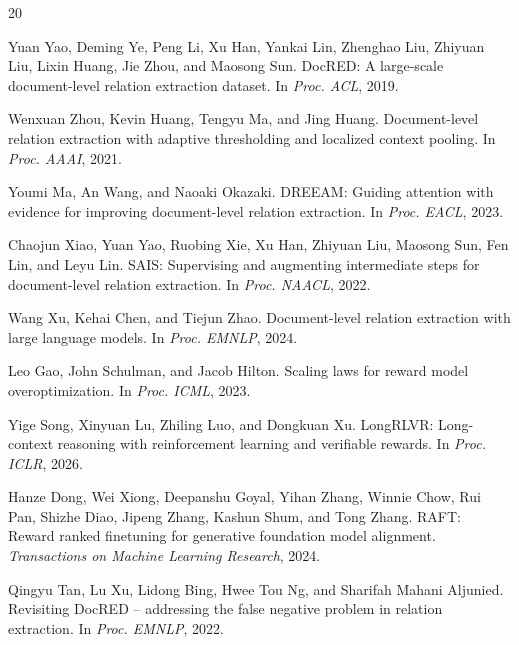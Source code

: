 \documentclass[11pt]{article}
\begin{document}
\begin{thebibliography}{20}

Yuan Yao, Deming Ye, Peng Li, Xu Han, Yankai Lin, Zhenghao Liu, Zhiyuan Liu, Lixin Huang, Jie Zhou, and Maosong Sun.
\newblock DocRED: A large-scale document-level relation extraction dataset.
\newblock In \emph{Proc. ACL}, 2019.

Wenxuan Zhou, Kevin Huang, Tengyu Ma, and Jing Huang.
\newblock Document-level relation extraction with adaptive thresholding and localized context pooling.
\newblock In \emph{Proc. AAAI}, 2021.

Youmi Ma, An Wang, and Naoaki Okazaki.
\newblock DREEAM: Guiding attention with evidence for improving document-level relation extraction.
\newblock In \emph{Proc. EACL}, 2023.

Chaojun Xiao, Yuan Yao, Ruobing Xie, Xu Han, Zhiyuan Liu, Maosong Sun, Fen Lin, and Leyu Lin.
\newblock SAIS: Supervising and augmenting intermediate steps for document-level relation extraction.
\newblock In \emph{Proc. NAACL}, 2022.

Wang Xu, Kehai Chen, and Tiejun Zhao.
\newblock Document-level relation extraction with large language models.
\newblock In \emph{Proc. EMNLP}, 2024.

Leo Gao, John Schulman, and Jacob Hilton.
\newblock Scaling laws for reward model overoptimization.
\newblock In \emph{Proc. ICML}, 2023.

Yige Song, Xinyuan Lu, Zhiling Luo, and Dongkuan Xu.
\newblock LongRLVR: Long-context reasoning with reinforcement learning and verifiable rewards.
\newblock In \emph{Proc. ICLR}, 2026.

Hanze Dong, Wei Xiong, Deepanshu Goyal, Yihan Zhang, Winnie Chow, Rui Pan, Shizhe Diao, Jipeng Zhang, Kashun Shum, and Tong Zhang.
\newblock RAFT: Reward ranked finetuning for generative foundation model alignment.
\newblock \emph{Transactions on Machine Learning Research}, 2024.

Qingyu Tan, Lu Xu, Lidong Bing, Hwee Tou Ng, and Sharifah Mahani Aljunied.
\newblock Revisiting DocRED -- addressing the false negative problem in relation extraction.
\newblock In \emph{Proc. EMNLP}, 2022.

\end{thebibliography}
\end{document}
